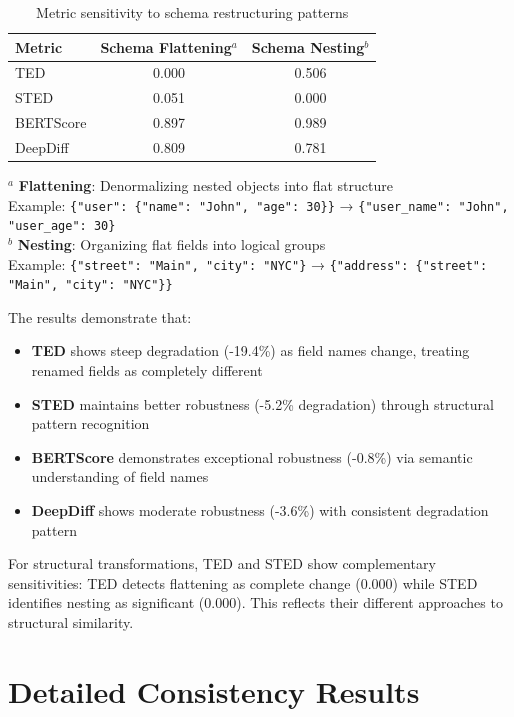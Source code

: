\documentclass{article}
\begin{document}
\begin{table}[H]
\centering
\caption{Metric sensitivity to schema restructuring patterns}
\label{tab:structural-perturbations}
\begin{tabular}{lcc}
\toprule
\textbf{Metric} & \textbf{Schema Flattening}$^a$ & \textbf{Schema Nesting}$^b$ \\
\midrule
TED & 0.000 & 0.506 \\
STED & 0.051 & 0.000 \\
BERTScore & 0.897 & 0.989 \\
DeepDiff & 0.809 & 0.781 \\
\bottomrule
\end{tabular}
\vspace{2mm}
\begin{flushleft}
\small $^a$ \textbf{Flattening}: Denormalizing nested objects into flat structure\\
\small Example: \texttt{\{"user": \{"name": "John", "age": 30\}\}} → \texttt{\{"user\_name": "John", "user\_age": 30\}}\\[1mm]
\small $^b$ \textbf{Nesting}: Organizing flat fields into logical groups\\
\small Example: \texttt{\{"street": "Main", "city": "NYC"\}} → \texttt{\{"address": \{"street": "Main", "city": "NYC"\}\}}
\end{flushleft}
\end{table}

The results demonstrate that:
\begin{itemize}
\item \textbf{TED} shows steep degradation (-19.4\%) as field names change, treating renamed fields as completely different
\item \textbf{STED} maintains better robustness (-5.2\% degradation) through structural pattern recognition
\item \textbf{BERTScore} demonstrates exceptional robustness (-0.8\%) via semantic understanding of field names
\item \textbf{DeepDiff} shows moderate robustness (-3.6\%) with consistent degradation pattern
\end{itemize}

For structural transformations, TED and STED show complementary sensitivities: TED detects flattening as complete change (0.000) while STED identifies nesting as significant (0.000). This reflects their different approaches to structural similarity.

\section{Detailed Consistency Results}
\end{document}
